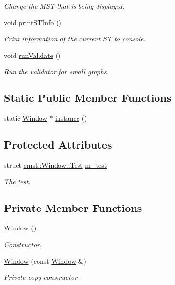 \begin{DoxyCompactItemize}
\begin{DoxyCompactList}\small\item\em Change the M\+ST that is being displayed. \end{DoxyCompactList}\item 
void \hyperlink{classcmst_1_1_window_a5b39068b3053a7fe98f3d94de802fecb}{print\+S\+T\+Info} ()
\begin{DoxyCompactList}\small\item\em Print information of the current ST to console. \end{DoxyCompactList}\item 
void \hyperlink{classcmst_1_1_window_ab2073132753d04d6cf7b882549f1ceea}{run\+Validate} ()
\begin{DoxyCompactList}\small\item\em Run the validator for small graphs. \end{DoxyCompactList}\end{DoxyCompactItemize}
\subsection*{Static Public Member Functions}
\begin{DoxyCompactItemize}
\item 
static \hyperlink{classcmst_1_1_window}{Window} $\ast$ \hyperlink{classcmst_1_1_window_a281790e82296e7be50c19520f136e345}{instance} ()
\end{DoxyCompactItemize}
\subsection*{Protected Attributes}
\begin{DoxyCompactItemize}
\item 
struct \hyperlink{structcmst_1_1_window_1_1_test}{cmst\+::\+Window\+::\+Test} \hyperlink{classcmst_1_1_window_aedae466fb2efd886cea6d775b20fabe3}{m\+\_\+test}
\begin{DoxyCompactList}\small\item\em The test. \end{DoxyCompactList}\end{DoxyCompactItemize}
\subsection*{Private Member Functions}
\begin{DoxyCompactItemize}
\item 
\hyperlink{classcmst_1_1_window_a2f0377f780b0dec7f9ca43145d98e8d1}{Window} ()
\begin{DoxyCompactList}\small\item\em Constructor. \end{DoxyCompactList}\item 
\hyperlink{classcmst_1_1_window_a3a06a150faa316137c794be5acac4979}{Window} (const \hyperlink{classcmst_1_1_window}{Window} \&)
\begin{DoxyCompactList}\small\item\em Private copy-\/constructor. \end{DoxyCompactList}\end{DoxyCompactItemize}
